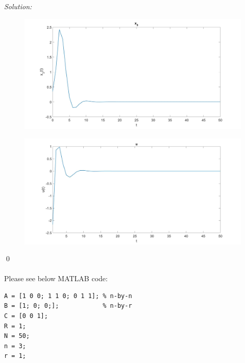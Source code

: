 \documentclass{article}
\newenvironment{sol}
    {\emph{Solution:}
    }
    {
    \qed
    }
\begin{document}
\begin{enumerate}
\begin{enumerate}
\begin{sol}
\begin{figure}[H]
                \end{figure}
                \begin{figure}[H]
                    \vspace{-10pt}
                    \includegraphics[width=\textwidth,left]{EE 363/HW1/Figures/Figure 6.jpg}
                    \label{fig:Fig_6}
                \end{figure}
                \begin{figure}[H]
                    \vspace{-10pt}
                    \includegraphics[width=\textwidth,left]{EE 363/HW1/Figures/Figure 7.jpg}
                    \label{fig:Fig_7}
                \end{figure}
        \end{sol}
        \\
        \\
        Please see below MATLAB code:
            
            
\begin{lstlisting}[style=Matlab-editor]
% Given directly from problem
A = [1 0 0; 1 1 0; 0 1 1]; % n-by-n
B = [1; 0; 0;];            % n-by-r
C = [0 0 1];
R = 1;
N = 50;
n = 3;
r = 1;


\end{lstlisting}
\end{enumerate}
\end{enumerate}
\end{document}
